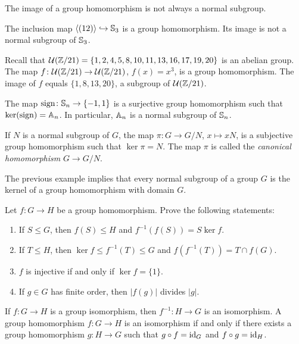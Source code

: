 The image of a group homomorphism
is not always a normal subgroup. 

\begin{example}
The inclusion map $\langle (12)\rangle\hookrightarrow\mathbb{S}_3$ is a group
homomorphism. Its image is not a normal subgroup of $\mathbb{S}_3$.
\end{example}

\begin{example}
Recall that $\mathcal{U}(\mathbb{Z}/21)=\{1,2,4,5,8,10,11,13,16,17,19,20\}$ is an abelian group. The map 
$f\colon\mathcal{U}(\mathbb{Z}/21)\to\mathcal{U}(\mathbb{Z}/21)$, $f(x)=x^3$, is a group
homomorphism. The image of 
$f$ equals $\{1,8,13,20\}$, a subgroup of $\mathcal{U}(\mathbb{Z}/21)$.
\end{example}

\begin{example}
The map $\operatorname{sign}\colon\mathbb{S}_n\to\{-1,1\}$ is a surjective group 
homomorphism such that  
$\ker(\operatorname{sign})=\mathbb{A}_n$. In particular, $\mathbb{A}_n$ is a normal subgroup of $\mathbb{S}_n$.
\end{example}

\begin{example}
If $N$ is a normal subgroup of $G$, the map $\pi\colon G\to G/N$, $x\mapsto xN$, is a subjective group homomorphism such that 
$\ker\pi=N$. The map $\pi$ is called 
the \emph{canonical homomorphism} $G\to G/N$.
\end{example}

The previous example implies that 
every normal subgroup of a group $G$ is the kernel of a group
homomorphism with domain $G$. 


\begin{exercise}
Let $f\colon G\to H$ be a group homomorphism. 
Prove the following statements:
\begin{enumerate}
\item If $S\leq G$, then $f(S)\leq H$ and $f^{-1}(f(S))=S\ker f$.
\item If $T\leq H$, then $\ker f\leq f^{-1}(T)\leq G$ and $f(f^{-1}(T))=T\cap f(G)$.
\item $f$ is injective if and only if $\ker f=\{1\}$.
\item If $g\in G$ has finite order, then $|f(g)|$ divides $|g|$.
\end{enumerate}
\end{exercise}

If $f\colon G\to H$ is a group isomorphism, then
$f^{-1}\colon H\to G$ is an isomorphism. A group
homomorphism $f\colon G\to H$ is an isomorphism
if and only if there exists a group homomorphism 
$g\colon H\to G$ such that $g\circ f=\operatorname{id}_G$ and $f\circ g=\operatorname{id}_H$.

